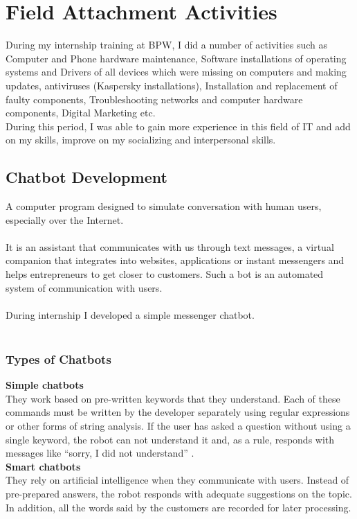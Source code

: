 \chapter{Field Attachment Activities}
During my internship training at BPW, I did a number of activities such as Computer and Phone hardware maintenance, Software installations of operating systems and Drivers of all devices which were missing on computers and making updates, anti­viruses (Kaspersky installations), Installation and replacement of faulty components, Troubleshooting networks and computer hardware components, Digital Marketing\cite{Digital} etc. \\
During this period, I was able to gain more experience in this field of IT and add on my skills, improve on my socializing and interpersonal skills. 
\section{Chatbot Development}
 A computer program designed to simulate conversation with human users, especially over the Internet. \\ \\
\noindent It is an assistant that communicates with us through text messages, a virtual companion that integrates into websites, applications or instant messengers and helps entrepreneurs to get closer to customers. Such a bot is an automated system of communication with users. \\ \\
\noindent During internship I developed a simple messenger chatbot. \\ \\
\subsection{Types of Chatbots}
\normalsize{\bf Simple chatbots} \\
They work based on pre-written keywords that they understand. Each of these commands must be written by the developer separately using regular expressions or other forms of string analysis. If the user has asked a question without using a single keyword, the robot can not understand it and, as a rule, responds with messages like “sorry, I did not understand” .\\
\normalsize{\bf Smart chatbots} \\
They rely on artificial intelligence when they communicate with users. Instead of pre-prepared answers, the robot responds with adequate suggestions on the topic. In addition, all the words said by the customers are recorded for later processing.\\
